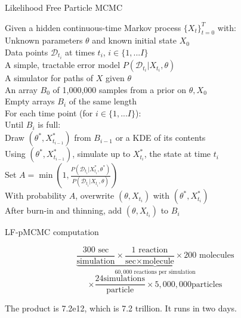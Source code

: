 \documentclass[12pt,a4paper,t,xcolor=dvipsnames,slidestop,compress,mathserif]{beamer}
\begin{document}
\begin{frame}{Likelihood Free Particle MCMC}

\begin{algorithm}[H]
Given a hidden continuous-time Markov process $\{X_t\}_{t=0}^T$ with: \\
\Indp \Indp
Unknown parameters $\theta$ and known initial state $X_0$\\
Data points $\mathcal{D}_{t_{i}}$ at times $t_{i}$, $i \in \{1, ... I\}$ \\
A simple, tractable error model $P(\mathcal{D}_{t_{i}}|X_{t_{i}}, \theta)$\\
A simulator for paths of $X$ given $\theta$\\
An array $B_0$ of 1,000,000 samples from a prior on $\theta, X_0$\\
Empty arrays $B_{i}$ of the same length\\

\Indm \Indm
For each time point (for $i \in \{1, ... I\}$):\\
\Indp\Indp
Until $B_{i}$ is full: \\
\Indp\Indp
Draw $(\theta^*, X_{t_{i-1}}^*)$ from $B_{i-1}$ or a KDE of its contents\\
Using $(\theta^*, X_{t_{i-1}}^*)$, simulate up to $X_{t_{i}}^*$, the state at time $t_{i}$ \\
Set $A=\min(1, \frac{P(\mathcal{D}_{t_{i}}|X_{t_{i}}^*, \theta^*)}{P(\mathcal{D}_{t_{i}}|X_{t_{i}}, \theta)})$\\
With probability $A$, overwrite $(\theta, X_{t_{i}})$ with $(\theta^*, X_{t_{i}}^*)$\\
After burn-in and thinning, add $(\theta, X_{t_{i}})$ to $B_{i}$\\

\end{algorithm}
\end{frame}

\begin{frame}{LF-pMCMC computation}

$$\underbrace{\frac{300\text{ sec}}{\text{simulation}} \times \frac{1\text{ reaction}}{\text{sec}\times\text{molecule}}\times200 \text{{ molecules}}}_{60,000\text{ reactions per simulation}}$$
$$ \times \frac{24 \text{simulations}}{\text{particle}} \times 5,000,000 \text{particles}$$

The product is 7.2e12, which is 7.2 trillion. It runs in two days.\\
\end{frame}
\end{document}
